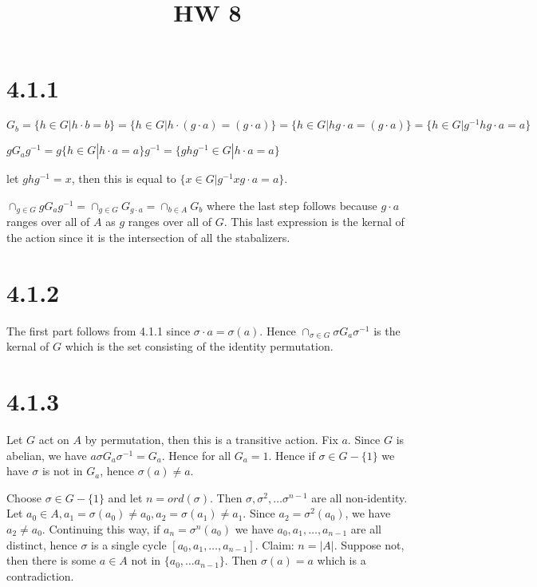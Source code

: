\documentclass{article}
\title{HW 8}
\date{}
\def\inv{{-1}}
\begin{document}
\maketitle




\section*{4.1.1}

$G_b = \{h \in G | h \cdot b = b\} = \{h \in G | h \cdot (g \cdot a) = (g \cdot a)\} = \{h \in G | hg \cdot a = (g \cdot a)\} = \{h \in G | g^\inv h g \cdot a = a\}$

$g G_a g^\inv = g \{h \in G | h \cdot a = a\} g^\inv = \{ghg^\inv \in G | h \cdot a = a\} $

let $g h g^\inv = x$, then this is equal to $\{x \in G | g^\inv x g \cdot a = a\}$.

$\cap_{g \in G} g G_a g^\inv = \cap_{g \in G} G_{g \cdot a} = \cap_{b \in A} G_b$ where the last step follows because $g \cdot a$ ranges over all of $A$ as $g$ ranges over all of $G$. This last expression is the kernal of the action since it is the intersection of all the stabalizers.

\section*{4.1.2}

The first part follows from 4.1.1 since $\sigma \cdot a = \sigma(a)$. Hence $\cap_{\sigma \in G} \sigma G_a \sigma^\inv$ is the kernal of $G$ which is the set consisting of the identity permutation. 

\section*{4.1.3}

Let $G$ act on $A$ by permutation, then this is a transitive action. Fix $a$. Since $G$ is abelian, we have $a\sigma G_a \sigma^\inv = G_a$. Hence for all $G_a = 1$. Hence if $\sigma \in G - \{1\}$ we have $\sigma$ is not in $G_a$, hence $\sigma(a) \ne a$.

Choose $\sigma \in G - \{1\}$ and let $n = ord(\sigma)$. Then $\sigma, \sigma^2, \ldots \sigma^{n-1}$ are all non-identity. Let $a_0 \in A, a_1 = \sigma(a_0) \ne a_0, a_2 = \sigma(a_1) \ne a_1$. Since $a_2 = \sigma^2 (a_0)$, we have $a_2 \ne a_0$. Continuing this way, if $a_n = \sigma^n (a_0)$ we have $a_0, a_1, \ldots, a_{n-1}$ are all distinct, hence $\sigma$ is a single cycle $[a_0, a_1, \ldots, a_{n-1}]$. Claim: $n = |A|$. Suppose not, then there is some $a \in A$ not in $\{a_0, \ldots a_{n-1}\}$. Then $\sigma(a) = a$ which is a contradiction.
\end{document}
